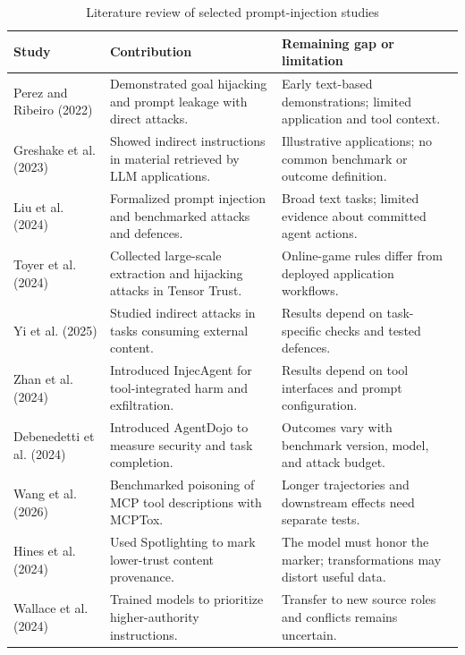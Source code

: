 \begin{table}[!t]
\caption{Literature review of selected prompt-injection studies}
\label{tab:literature}
\centering
\scriptsize
\renewcommand{\arraystretch}{1.05}
\begin{tabularx}{\textwidth}{@{}>{\raggedright\arraybackslash}p{}YY@{}}
\hline
\textbf{Study} & \textbf{Contribution} & \textbf{Remaining gap or limitation} \\
\hline
Perez and Ribeiro (2022) \cite{perez2022ignore} & Demonstrated goal hijacking and prompt leakage with direct attacks. & Early text-based demonstrations; limited application and tool context. \\
Greshake et al. (2023) \cite{greshake2023not} & Showed indirect instructions in material retrieved by LLM applications. & Illustrative applications; no common benchmark or outcome definition. \\
Liu et al. (2024) \cite{liu2024formalizing} & Formalized prompt injection and benchmarked attacks and defences. & Broad text tasks; limited evidence about committed agent actions. \\
Toyer et al. (2024) \cite{toyer2024tensor} & Collected large-scale extraction and hijacking attacks in Tensor Trust. & Online-game rules differ from deployed application workflows. \\
Yi et al. (2025) \cite{yi2025benchmarking} & Studied indirect attacks in tasks consuming external content. & Results depend on task-specific checks and tested defences. \\
Zhan et al. (2024) \cite{zhan2024injecagent} & Introduced InjecAgent for tool-integrated harm and exfiltration. & Results depend on tool interfaces and prompt configuration. \\
Debenedetti et al. (2024) \cite{debenedetti2024agentdojo} & Introduced AgentDojo to measure security and task completion. & Outcomes vary with benchmark version, model, and attack budget. \\
Wang et al. (2026) \cite{wang2026mcptox} & Benchmarked poisoning of MCP tool descriptions with MCPTox. & Longer trajectories and downstream effects need separate tests. \\
Hines et al. (2024) \cite{hines2024spotlighting} & Used Spotlighting to mark lower-trust content provenance. & The model must honor the marker; transformations may distort useful data. \\
Wallace et al. (2024) \cite{wallace2024hierarchy} & Trained models to prioritize higher-authority instructions. & Transfer to new source roles and conflicts remains uncertain. \\

\end{tabularx}
\end{table}
